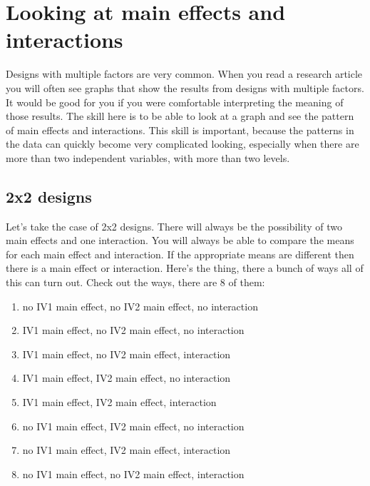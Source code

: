 \documentclass[
]{book}
\providecommand{\tightlist}{%
  \setlength{\itemsep}{0pt}\setlength{\parskip}{0pt}}
\begin{document}
\hypertarget{looking-at-main-effects-and-interactions}{%
\section{Looking at main effects and interactions}\label{looking-at-main-effects-and-interactions}}

Designs with multiple factors are very common. When you read a research article you will often see graphs that show the results from designs with multiple factors. It would be good for you if you were comfortable interpreting the meaning of those results. The skill here is to be able to look at a graph and see the pattern of main effects and interactions. This skill is important, because the patterns in the data can quickly become very complicated looking, especially when there are more than two independent variables, with more than two levels.

\hypertarget{x2-designs}{%
\subsection{2x2 designs}\label{x2-designs}}

Let's take the case of 2x2 designs. There will always be the possibility of two main effects and one interaction. You will always be able to compare the means for each main effect and interaction. If the appropriate means are different then there is a main effect or interaction. Here's the thing, there a bunch of ways all of this can turn out. Check out the ways, there are 8 of them:

\begin{enumerate}
\def\labelenumi{\arabic{enumi}.}
\tightlist
\item
  no IV1 main effect, no IV2 main effect, no interaction
\item
  IV1 main effect, no IV2 main effect, no interaction
\item
  IV1 main effect, no IV2 main effect, interaction
\item
  IV1 main effect, IV2 main effect, no interaction
\item
  IV1 main effect, IV2 main effect, interaction
\item
  no IV1 main effect, IV2 main effect, no interaction
\item
  no IV1 main effect, IV2 main effect, interaction
\item
  no IV1 main effect, no IV2 main effect, interaction
\end{enumerate}
\end{document}
